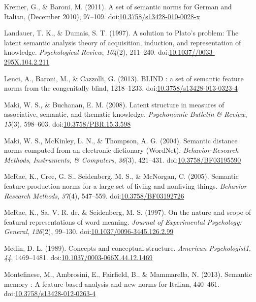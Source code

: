 \documentclass[english,man]{apa6}
\theoremstyle{definition}
\theoremstyle{definition}
\theoremstyle{definition}
\theoremstyle{remark}
\begin{document}
\hypertarget{ref-Kremer2011}{}
Kremer, G., \& Baroni, M. (2011). A set of semantic norms for German and
Italian, (December 2010), 97--109.
doi:\href{https://doi.org/10.3758/s13428-010-0028-x}{10.3758/s13428-010-0028-x}

\hypertarget{ref-Landauer1997}{}
Landauer, T. K., \& Dumais, S. T. (1997). A solution to Plato's problem:
The latent semantic analysis theory of acquisition, induction, and
representation of knowledge. \emph{Psychological Review}, \emph{104}(2),
211--240.
doi:\href{https://doi.org/10.1037//0033-295X.104.2.211}{10.1037//0033-295X.104.2.211}

\hypertarget{ref-Lenci2013}{}
Lenci, A., Baroni, M., \& Cazzolli, G. (2013). BLIND : a set of semantic
feature norms from the congenitally blind, 1218--1233.
doi:\href{https://doi.org/10.3758/s13428-013-0323-4}{10.3758/s13428-013-0323-4}

\hypertarget{ref-Maki2008}{}
Maki, W. S., \& Buchanan, E. M. (2008). Latent structure in measures of
associative, semantic, and thematic knowledge. \emph{Psychonomic
Bulletin \& Review}, \emph{15}(3), 598--603.
doi:\href{https://doi.org/10.3758/PBR.15.3.598}{10.3758/PBR.15.3.598}

\hypertarget{ref-Maki2004}{}
Maki, W. S., McKinley, L. N., \& Thompson, A. G. (2004). Semantic
distance norms computed from an electronic dictionary (WordNet).
\emph{Behavior Research Methods, Instruments, \& Computers},
\emph{36}(3), 421--431.
doi:\href{https://doi.org/10.3758/BF03195590}{10.3758/BF03195590}

\hypertarget{ref-McRae2005}{}
McRae, K., Cree, G. S., Seidenberg, M. S., \& McNorgan, C. (2005).
Semantic feature production norms for a large set of living and
nonliving things. \emph{Behavior Research Methods}, \emph{37}(4),
547--559.
doi:\href{https://doi.org/10.3758/BF03192726}{10.3758/BF03192726}

\hypertarget{ref-McRae1997}{}
McRae, K., Sa, V. R. de, \& Seidenberg, M. S. (1997). On the nature and
scope of featural representations of word meaning. \emph{Journal of
Experimental Psychology: General}, \emph{126}(2), 99--130.
doi:\href{https://doi.org/10.1037/0096-3445.126.2.99}{10.1037/0096-3445.126.2.99}

\hypertarget{ref-Medin1989}{}
Medin, D. L. (1989). Concepts and conceptual structure. \emph{American
Psychologist1}, \emph{44}, 1469--1481.
doi:\href{https://doi.org/10.1037/0003-066X.44.12.1469}{10.1037/0003-066X.44.12.1469}

\hypertarget{ref-Montefinese2013}{}
Montefinese, M., Ambrosini, E., Fairfield, B., \& Mammarella, N. (2013).
Semantic memory : A feature-based analysis and new norms for Italian,
440--461.
doi:\href{https://doi.org/10.3758/s13428-012-0263-4}{10.3758/s13428-012-0263-4}
\end{document}
